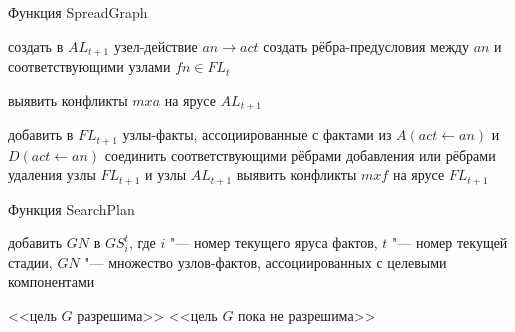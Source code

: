 \documentclass[b5paper,11pt]{book}
\numberwithin{Def}{section}
\numberwithin{Th}{chapter}
\numberwithin{St}{chapter}
\begin{document}
	\begin{algorithm}[h]
		\caption{Функция SpreadGraph}\label{alg:spread}
		\begin{algorithmic}[1]
				\Statex{}
						\State создать в $AL_{t + 1}$ узел-действие $an\rightarrow act$
						\State создать рёбра-предусловия между $an$ и соответствующими узлами $fn\in FL_t$
					\EndIf
				\EndFor
			
				\State выявить конфликты $mxa$ на ярусе $AL_{t + 1}$
				
				\Statex{}
					\State добавить в $FL_{t + 1}$ узлы-факты, ассоциированные с фактами из $A(act\leftarrow an)$ и $D(act\leftarrow an)$
					\State соединить соответствующими рёбрами добавления или рёбрами удаления узлы $FL_{t + 1}$ и узлы $AL_{t + 1}$
				\EndFor
				\State выявить конфликты $mxf$ на ярусе $FL_{t + 1}$
			\EndFunction
		\end{algorithmic}
	\end{algorithm}
	
	\begin{algorithm}[h]
		\caption{Функция SearchPlan}\label{alg:search}
		\begin{algorithmic}[1]
				\Statex{}
					\State добавить $GN$ в $GS_i^t$, где $i$ "--- номер текущего яруса фактов, $t$	"--- номер текущей стадии, $GN$ "--- множество узлов-фактов, ассоциированных	с целевыми компонентами
				\EndIf
		
					\State \Return <<цель $G$ разрешима>>
				\Else
					\State \Return <<цель $G$ пока не разрешима>>
				\EndIf
			\EndFunction
		\end{algorithmic}
	\end{algorithm}
			
\end{document}
